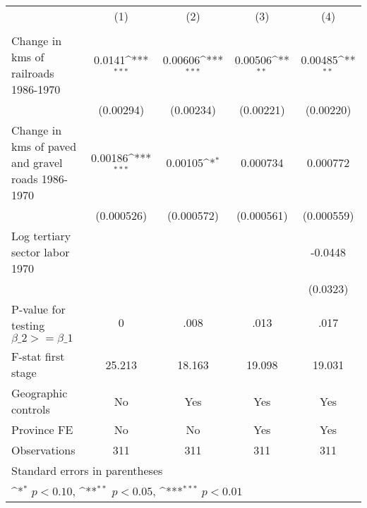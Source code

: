 {
\def\sym#1{\ifmmode^{#1}\else\(^{#1}\)\fi}
\begin{tabular}{l*{4}{c}}
\hline\hline
                &\multicolumn{1}{c}{(1)}&\multicolumn{1}{c}{(2)}&\multicolumn{1}{c}{(3)}&\multicolumn{1}{c}{(4)}\\
                &\multicolumn{1}{c}{}&\multicolumn{1}{c}{}&\multicolumn{1}{c}{}&\multicolumn{1}{c}{}\\
\hline
Change in kms of railroads 1986-1970&   0.0141\sym{***}&  0.00606\sym{***}&  0.00506\sym{**} &  0.00485\sym{**} \\
                &(0.00294)         &(0.00234)         &(0.00221)         &(0.00220)         \\
[1em]
Change in kms of paved and gravel roads 1986-1970&  0.00186\sym{***}&  0.00105\sym{*}  & 0.000734         & 0.000772         \\
                &(0.000526)         &(0.000572)         &(0.000561)         &(0.000559)         \\
[1em]
Log tertiary sector labor 1970&                  &                  &                  &  -0.0448         \\
                &                  &                  &                  & (0.0323)         \\
\hline
P-value for testing $\beta\_{2} >= \beta\_{1}$&        0         &     .008         &     .013         &     .017         \\
F-stat first stage&   25.213         &   18.163         &   19.098         &   19.031         \\
Geographic controls&       No         &      Yes         &      Yes         &      Yes         \\
Province FE     &       No         &       No         &      Yes         &      Yes         \\
Observations    &      311         &      311         &      311         &      311         \\
\hline\hline
\multicolumn{5}{l}{\footnotesize Standard errors in parentheses}\\
\multicolumn{5}{l}{\footnotesize \sym{*} \(p<0.10\), \sym{**} \(p<0.05\), \sym{***} \(p<0.01\)}\\
\end{tabular}
}

